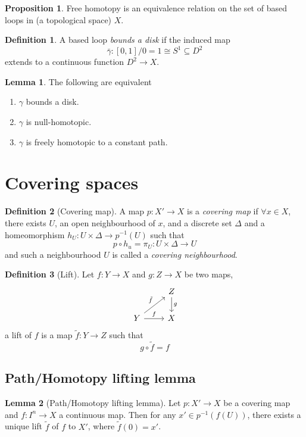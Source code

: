 \documentclass[a4paper,14pt]{extarticle}
\theoremstyle{definition}
\newtheorem*{definition}{Definition}
\newtheorem*{lemma}{Lemma}
\newtheorem*{proposition}{Proposition}
\begin{document}
\begin{proposition}
  Free homotopy is an equivalence relation on the set of based loops in (a topological space)
  $X$.
\end{proposition}

\begin{definition}
  A based loop \emph{bounds a disk} if the induced map \[\bar{\gamma}:[0,1]/
  {\scriptstyle 0=1}\cong S^1
  \subseteq D^2\] extends to a continuous function $D^2\rightarrow X$.
\end{definition}

\begin{lemma}
  The following are equivalent
  \begin{enumerate}
    \item $\gamma$ bounds a disk. 
    \item $\gamma$ is null-homotopic.
    \item $\gamma$ is freely homotopic to a constant path.
  \end{enumerate}
\end{lemma}

\section{Covering spaces}
\begin{definition}[Covering map]
  A map $p:X'\rightarrow X$ is a \emph{covering map} if $\forall x\in X$, there exists
  $U$, an open neighbourhood of $x$, and a discrete set $\Delta$ and a homeomorphism 
  $h_U:U\times\Delta\rightarrow p^{-1}(U)$ such that \[p\circ h_u=\pi_U:U\times\Delta\rightarrow 
  U\] and such a neighbourhood $U$ is called a \emph{covering neighbourhood}.
\end{definition}

\begin{definition}[Lift]
  Let $f:Y\rightarrow X$ and $g:Z\rightarrow X$ be two maps,
  \[
    \begin{tikzcd}
      &Z\arrow{d}{g} \\ Y\arrow{ur}{\tilde{f}} \arrow{r}{f}&X
    \end{tikzcd}\]
  a lift of $f$ is a map $\tilde{f}:Y\rightarrow Z$ such that \[g\circ\tilde{f}=f\]
\end{definition}

\subsection{Path/Homotopy lifting lemma}
\begin{lemma}[Path/Homotopy lifting lemma]
  Let $p:X'\rightarrow X$ be a covering map and $f:I^n\rightarrow X$ a continuous map.
  Then for any $x'\in p^{-1}(f(U))$, there exists a unique lift $\tilde{f}$ of $f$ to 
  $X'$, where $\tilde{f}(0)=x'$. 
\end{lemma}
\end{document}
